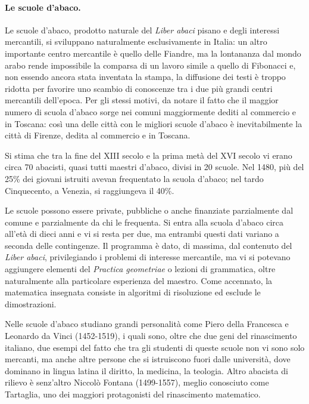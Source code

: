 \paragraph{Le scuole d'abaco.} Le scuole d'abaco, prodotto naturale del \textit{Liber abaci} pisano e degli interessi mercantili, si sviluppano naturalmente esclusivamente in Italia: un altro importante centro mercantile \`e quello delle Fiandre, ma la lontananza dal mondo arabo rende impossibile la comparsa di un lavoro simile a quello di Fibonacci e, non essendo ancora stata inventata la stampa, la diffusione dei testi \`e troppo ridotta per favorire uno scambio di conoscenze tra i due pi\`u grandi centri mercantili dell'epoca. Per gli stessi motivi, da notare il fatto che il maggior numero di scuola d'abaco sorge nei comuni maggiormente dediti al commercio e in Toscana: cos\`i una delle citt\`a con le migliori scuole d'abaco \`e inevitabilmente la citt\`a di Firenze, dedita al commercio e in Toscana.
\par Si stima che tra la fine del XIII secolo e la prima met\`a del XVI secolo vi erano circa 70 abacisti, quasi tutti maestri d'abaco, divisi in 20 scuole. Nel 1480, pi\`u del 25\% dei giovani istruiti avevan frequentato la scuola d'abaco; nel tardo Cinquecento, a Venezia, si raggiungeva il 40\%.
\par Le scuole possono essere private, pubbliche o anche finanziate parzialmente dal comune e parzialmente da chi le frequenta. Si entra alla scuola d'abaco circa all'et\`a di dieci anni e vi si resta per due, ma entrambi questi dati variano a seconda delle contingenze. Il programma \`e dato, di massima, dal contenuto del \textit{Liber abaci}, privilegiando i problemi di interesse mercantile, ma vi si potevano aggiungere elementi del \textit{Practica geometriae} o lezioni di grammatica, oltre naturalmente alla particolare esperienza del maestro. Come accennato, la matematica insegnata consiste in algoritmi di risoluzione ed esclude le dimostrazioni.
\par Nelle scuole d'abaco studiano grandi personalit\`a come Piero della Francesca e Leonardo da Vinci (1452-1519), i quali sono, oltre che due geni del rinascimento italiano, due esempi del fatto che tra gli studenti di queste scuole non vi sono solo mercanti, ma anche altre persone che si istruiscono fuori dalle universit\`a, dove dominano in lingua latina il diritto, la medicina, la teologia. Altro abacista di rilievo \`e senz'altro Niccol\`o Fontana (1499-1557), meglio conosciuto come Tartaglia, uno dei maggiori protagonisti del rinascimento matematico.
